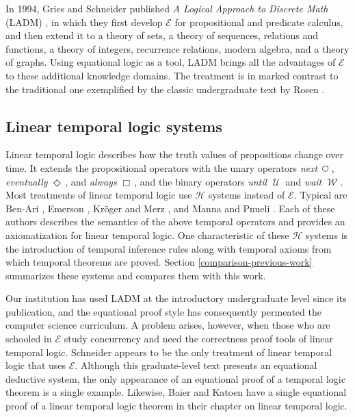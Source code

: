 \documentclass[12pt, fleqn, leqno]{article}
\newcommand{\Until}{\;\mathcal{U}\;}
\newcommand{\Wait}{\;\mathcal{W}\;}
\newcommand{\Next}{\;\,\text{\raisebox{3.5pt}{\circle{6}}}}
\newcommand{\Event}{\Diamond\,}
\newcommand{\Always}{\Box\,}
\begin{document}
In 1994, Gries and Schneider published \textit{A Logical Approach to Discrete Math} (LADM) \cite{LADM}, in which they first develop $\mathcal{E}$ for propositional and predicate calculus, and then extend it to a theory of sets, a theory of sequences, relations and functions, a theory of integers, recurrence relations, modern algebra, and a theory of graphs.
Using equational logic as a tool, LADM brings all the advantages of $\mathcal{E}$ to these additional knowledge domains.
The treatment is in marked contrast to the traditional one exemplified by the classic undergraduate text by Rosen \cite{Rosen}.

\subsection{Linear temporal logic systems}

Linear temporal logic describes how the truth values of propositions change over time.
It extends the propositional operators with the unary operators \textit{next} $\Next$, \textit{eventually} $\Event$, and \textit{always} $\Always$, and the binary operators \textit{until} $\Until$ and \textit{wait} $\Wait$.
Most treatments of linear temporal logic use $\mathcal{H}$ systems instead of $\mathcal{E}$.
Typical are Ben-Ari \cite{Ben2}, Emerson \cite{Emer}, Kröger and Merz \cite{Kroger}, and Manna and Pnueli \cite{Manna}.
Each of these authors describes the semantics of the above temporal operators and provides an axiomatization for linear temporal logic.
One characteristic of these $\mathcal{H}$ systems is the introduction of temporal inference rules along with temporal axioms from which temporal theorems are proved.
Section \ref{comparison-previous-work} summarizes these systems and compares them with this work.

Our institution has used LADM at the introductory undergraduate level since its publication, and the equational proof style has consequently permeated the computer science curriculum.
A problem arises, however, when those who are schooled in $\mathcal{E}$ study concurrency and need the correctness proof tools of linear temporal logic.
Schneider \cite{Schn} appears to be the only treatment of linear temporal logic that uses $\mathcal{E}$.
Although this graduate-level text presents an equational deductive system, the only appearance of an equational proof of a temporal logic theorem is a single example.
Likewise, Baier and Katoen \cite{Baier} have a single equational proof of a linear temporal logic theorem in their chapter on linear temporal logic.
\end{document}
